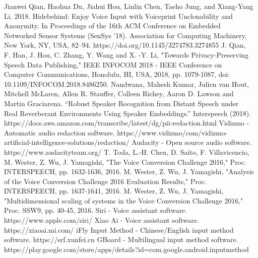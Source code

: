 \documentclass[journal]{IEEEtran} %
\begin{document}
\begin{thebibliography}{00}
     Jianwei Qian, Haohua Du, Jiahui Hou, Linlin Chen, Taeho Jung, and Xiang-Yang Li. 2018. Hidebehind: Enjoy Voice Input with Voiceprint Unclonability and Anonymity. In Proceedings of the 16th ACM Conference on Embedded Networked Sensor Systems (SenSys '18). Association for Computing Machinery, New York, NY, USA, 82–94. https://doi.org/10.1145/3274783.3274855
     J. Qian, F. Han, J. Hou, C. Zhang, Y. Wang and X. -Y. Li, "Towards Privacy-Preserving Speech Data Publishing," IEEE INFOCOM 2018 - IEEE Conference on Computer Communications, Honolulu, HI, USA, 2018, pp. 1079-1087, doi: 10.1109/INFOCOM.2018.8486250.
     Nandwana, Mahesh Kumar, Julien van Hout, Mitchell McLaren, Allen R. Stauffer, Colleen Richey, Aaron D. Lawson and Martin Graciarena. “Robust Speaker Recognition from Distant Speech under Real Reverberant Environments Using Speaker Embeddings.” Interspeech (2018).
     https://docs.aws.amazon.com/transcribe/latest/dg/pii-redaction.html
     Vidizmo - Automatic audio redaction software. https://www.vidizmo/com/vidizmo-artificial-intelligence-solutions/redaction/
     Audacity - Open source audio software. https://www.audacityteam.org/
     T. Toda, L.-H. Chen, D. Saito, F. Villavicencio, M. Wester, Z. Wu, J. Yamagishi, "The Voice Conversion Challenge 2016," Proc. INTERSPEECH, pp. 1632-1636, 2016.
     M. Wester, Z. Wu, J. Yamagishi, "Analysis of the Voice Conversion Challenge 2016 Evaluation Results," Proc. INTERSPEECH, pp. 1637-1641, 2016.
     M. Wester, Z. Wu, J. Yamagishi, "Multidimensional scaling of systems in the Voice Conversion Challenge 2016," Proc. SSW9, pp. 40-45, 2016.
     Siri - Voice assistant software. https://www.apple.com/siri/
     Xiao Ai - Voice assistant software. https://xiaoai.mi.com/
     iFly Input Method - Chinese/English input method software. https://srf.xunfei.cn
     GBoard - Multilingual input method software. https://play.google.com/store/apps/details?id=com.google.android.inputmethod
\end{thebibliography}
\end{document}
